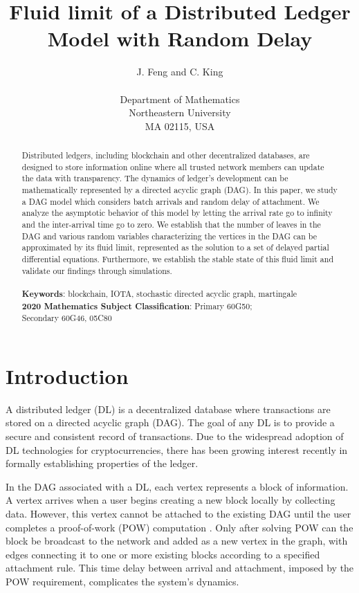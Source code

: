 \documentclass[12pt]{article}
\title{Fluid limit of a Distributed Ledger Model with Random Delay} %
\author{J. Feng and C. King\\
\\
Department of Mathematics \\
Northeastern University \\
MA 02115, USA}
\date{}
\numberwithin{equation}{section}  %
\begin{document}
\maketitle




\begin{abstract}
Distributed ledgers, including blockchain and other decentralized databases, are designed to store information online where all trusted network members can update the data with transparency. The dynamics of ledger's development can be mathematically represented by a directed acyclic graph (DAG). In this paper, we study a DAG model which considers batch arrivals and random delay of attachment. We analyze the asymptotic behavior of this model by letting the arrival rate go to infinity and the inter-arrival time go to zero. We establish that the number of leaves in the DAG and various random variables characterizing the vertices in the DAG can be approximated by its fluid limit, represented as the solution to a set of delayed partial differential equations. Furthermore, we establish the stable state of this fluid limit and validate our findings through simulations.\\
\quad\\
\textbf{Keywords}: blockchain, IOTA, stochastic directed acyclic graph, martingale\\
\textbf{2020 Mathematics Subject Classification}: Primary 60G50;\\
\null \hspace{8cm} Secondary 60G46, 05C80
\end{abstract}


\section{Introduction}
A distributed ledger (DL) is a decentralized database where transactions are stored on a directed acyclic graph (DAG). The goal of any DL is to provide a secure and consistent record of transactions. Due to the widespread adoption of {DL technologies} for cryptocurrencies, there has been growing interest recently in formally establishing properties of the ledger.

{In the DAG associated with a DL, each vertex represents a block of information.} {A vertex arrives when a user begins creating a new block locally by collecting data. However, this vertex cannot be attached to the existing DAG until the user completes a proof-of-work (POW) computation \cite{back2002hashcash}. Only after solving POW can the block be broadcast to the network and added as a new vertex in the graph, with edges connecting it to one or more existing blocks according to a specified attachment rule. This time delay between arrival and attachment, imposed by the POW requirement, complicates the system's dynamics.} 
\end{document}
